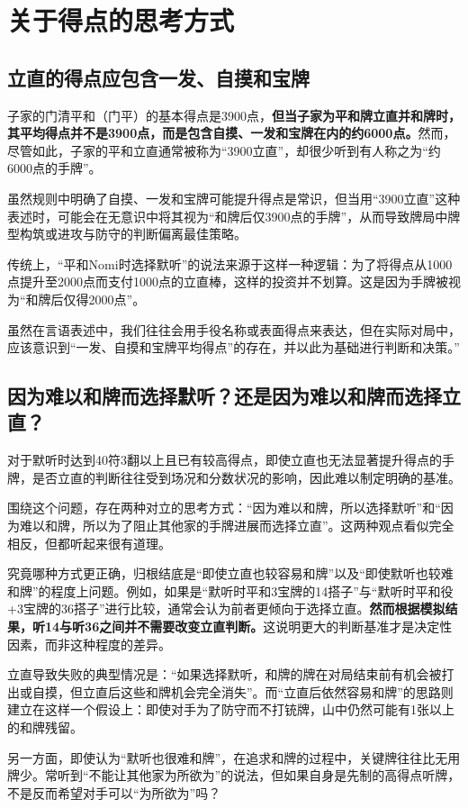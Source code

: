 \section{关于得点的思考方式}
\subsection{立直的得点应包含一发、自摸和宝牌}
子家的门清平和（门平）的基本得点是3900点，\textbf{但当子家为平和牌立直并和牌时，其平均得点并不是3900点，而是包含自摸、一发和宝牌在内的约6000点。}然而，尽管如此，子家的平和立直通常被称为“3900立直”，却很少听到有人称之为“约6000点的手牌”。

虽然规则中明确了自摸、一发和宝牌可能提升得点是常识，但当用“3900立直”这种表述时，可能会在无意识中将其视为“和牌后仅3900点的手牌”，从而导致牌局中牌型构筑或进攻与防守的判断偏离最佳策略。

传统上，“平和Nomi时选择默听”的说法来源于这样一种逻辑：为了将得点从1000点提升至2000点而支付1000点的立直棒，这样的投资并不划算。这是因为手牌被视为“和牌后仅得2000点”。

虽然在言语表述中，我们往往会用手役名称或表面得点来表达，但在实际对局中，应该意识到“一发、自摸和宝牌平均得点”的存在，并以此为基础进行判断和决策。”

\subsection{因为难以和牌而选择默听？还是因为难以和牌而选择立直？}
对于默听时达到40符3翻以上且已有较高得点，即使立直也无法显著提升得点的手牌，是否立直的判断往往受到场况和分数状况的影响，因此难以制定明确的基准。

围绕这个问题，存在两种对立的思考方式：“因为难以和牌，所以选择默听”和“因为难以和牌，所以为了阻止其他家的手牌进展而选择立直”。这两种观点看似完全相反，但都听起来很有道理。

究竟哪种方式更正确，归根结底是“即使立直也较容易和牌”以及“即使默听也较难和牌”的程度上问题。例如，如果是“默听时平和3宝牌的14搭子”与“默听时平和役+3宝牌的36搭子”进行比较，通常会认为前者更倾向于选择立直。\textbf{然而根据模拟结果，听14与听36之间并不需要改变立直判断。}这说明更大的判断基准才是决定性因素，而非这种程度的差异。

立直导致失败的典型情况是：“如果选择默听，和牌的牌在对局结束前有机会被打出或自摸，但立直后这些和牌机会完全消失”。而“立直后依然容易和牌”的思路则建立在这样一个假设上：即使对手为了防守而不打铳牌，山中仍然可能有1张以上的和牌残留。

另一方面，即使认为“默听也很难和牌”，在追求和牌的过程中，关键牌往往比无用牌少。常听到“不能让其他家为所欲为”的说法，但如果自身是先制的高得点听牌，不是反而希望对手可以“为所欲为”吗？

